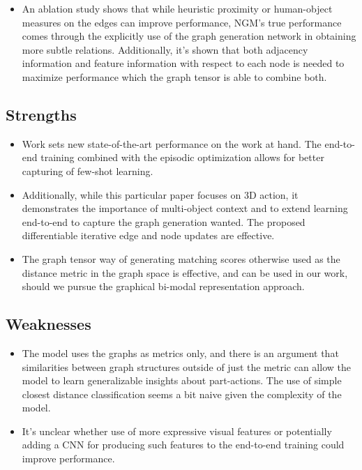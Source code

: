 \documentclass{article}
\begin{document}
\begin{itemize}
    \item An ablation study shows that while heuristic proximity or human-object measures on the edges can improve performance, NGM's true performance comes through the explicitly use of the graph generation network in obtaining more subtle relations. Additionally, it's shown that both adjacency information and feature information with respect to each node is needed to maximize performance which the graph tensor is able to combine both.
\end{itemize}

\subsection{Strengths}
\begin{itemize}
    \item Work sets new state-of-the-art performance on the work at hand. The end-to-end training combined with the episodic optimization allows for better capturing of few-shot learning.
    \item Additionally, while this particular paper focuses on 3D action, it demonstrates the importance of multi-object context and to extend learning end-to-end to capture the graph generation wanted. The proposed differentiable iterative edge and node updates are effective.
    \item The graph tensor way of generating matching scores otherwise used as the distance metric in the graph space is effective, and can be used in our work, should we pursue the graphical bi-modal representation approach.
\end{itemize}

\subsection{Weaknesses}
\begin{itemize}
    \item The model uses the graphs as metrics only, and there is an argument that similarities between graph structures outside of just the metric can allow the model to learn generalizable insights about part-actions. The use of simple closest distance classification seems a bit naive given the complexity of the model.
    \item It's unclear whether use of more expressive visual features or potentially adding a CNN for producing such features to the end-to-end training could improve performance.
\end{itemize}
\end{document}
